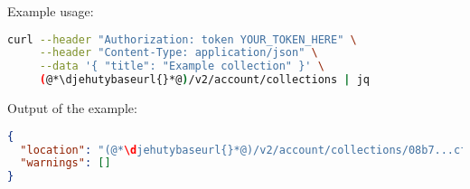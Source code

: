   Example usage:
\begin{lstlisting}[language=bash]
curl --header "Authorization: token YOUR_TOKEN_HERE" \
     --header "Content-Type: application/json" \
     --data '{ "title": "Example collection" }' \
     (@*\djehutybaseurl{}*@)/v2/account/collections | jq
\end{lstlisting}

  Output of the example:
\begin{lstlisting}[language=JSON]
{
  "location": "(@*\djehutybaseurl{}*@)/v2/account/collections/08b7...cfa8",
  "warnings": []
}
\end{lstlisting}
